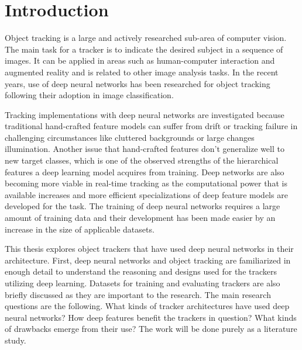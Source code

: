 \section{Introduction}
Object tracking is a large and actively researched sub-area of computer vision. The
main task for a tracker is to indicate the desired subject in a sequence of images.
It can be applied in areas such as human-computer interaction and augmented reality
and is related to other image analysis tasks. In the recent years, use of deep neural
networks has been researched for object tracking following their adoption in image
classification.

Tracking implementations with deep neural networks are investigated because traditional
hand-crafted feature models can suffer from drift or tracking failure in challenging
circumstances like cluttered backgrounds or large changes illumination. Another issue
that hand-crafted features don’t generalize well to new target classes, which is one
of the observed strengths of the hierarchical features a deep learning model acquires
from training. Deep networks are also becoming more viable in real-time tracking as
the computational power that is available increases and more efficient specializations
of deep feature models are developed for the task. The training of deep neural networks
requires a large amount of training data and their development has been made easier by
an increase in the size of applicable datasets.

This thesis explores object trackers that have used deep neural networks in their
architecture. First, deep neural networks and object tracking are familiarized in
enough detail to understand the reasoning and designs used for the trackers utilizing
deep learning. Datasets for training and evaluating trackers are also briefly discussed
as they are important to the research. The main research questions are the following.
What kinds of tracker architectures have used deep neural networks? How deep features
benefit the trackers in question? What kinds of drawbacks emerge from their use? The
work will be done purely as a literature study. 
